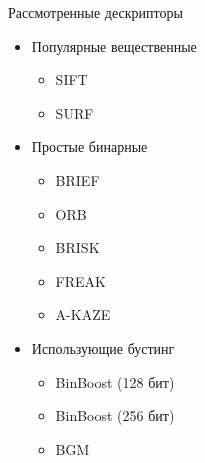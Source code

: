 \documentclass[14pt,mathserif,aspectratio=43]{beamer}
\begin{document}
\begin{frame}{Рассмотренные дескрипторы}
    \begin{itemize}
    	\item Популярные вещественные

    	\begin{itemize}
    		\item SIFT

    		\item SURF

    	\end{itemize}

		\item Простые бинарные

		\begin{itemize}

			\item BRIEF

    		\item ORB

    		\item BRISK

			\item FREAK

			\item A-KAZE

		\end{itemize}

		\item Использующие бустинг

		\begin{itemize}

			\item BinBoost (128 бит)

    		\item BinBoost (256 бит)

    		\item BGM

		\end{itemize}
	\end{itemize}
\end{frame}
\end{document}

